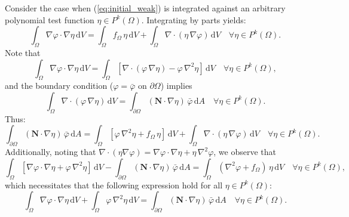 	Consider the case when (\ref{eq:initial_weak}) is integrated against an arbitrary polynomial test function $\eta \in P^k (\Omega)$. Integrating by parts yields:
	\begin{equation}
		\int_\Omega \nabla \varphi \cdot \nabla \eta \, \mathrm dV = \int_\Omega f_{\Omega} \, \eta \, \mathrm dV + \int_{\Omega} \nabla \cdot (\eta \, \nabla \varphi) \, \mathrm dV \quad \forall \eta \in P^k (\Omega).
	\end{equation}
	Note that
	\begin{equation}
		\int_\Omega \nabla \varphi \cdot \nabla \eta \, \mathrm dV = \int_\Omega \left[ \nabla \cdot (\varphi \, \nabla \eta) - \varphi \, \nabla^2 \eta \right] \, \mathrm dV \quad \forall \eta \in P^k (\Omega),
	\end{equation}
	and the boundary condition ($\varphi = \bar{\varphi}$ on $\partial \Omega$) implies
	\begin{equation}
		\int_\Omega \nabla \cdot (\varphi \, \nabla \eta) \, \mathrm dV = \int_{\partial \Omega} (\bm{N} \cdot \nabla \eta) \, \bar{\varphi} \, \mathrm dA \quad \forall \eta \in P^k (\Omega).
	\end{equation}
	Thus:
	\begin{equation}
		\int_{\partial \Omega} (\bm{N} \cdot \nabla \eta) \, \bar{\varphi} \, \mathrm dA = \int_\Omega \left[ \varphi \, \nabla^2 \eta + f_{\Omega} \, \eta \right] \, \mathrm dV + \int_{\Omega} \nabla \cdot (\eta \, \nabla \varphi) \, \mathrm dV \quad \forall \eta \in P^k (\Omega).
	\end{equation}
	Additionally, noting that $\nabla \cdot (\eta \nabla \varphi) = \nabla \varphi \cdot \nabla \eta + \eta \, \nabla^2 \varphi$, we observe that
	\begin{equation}
		\int_{\Omega} \left[ \nabla \varphi \cdot \nabla \eta + \varphi \, \nabla^2 \eta \right] \, \mathrm dV - \int_{\partial \Omega} (\bm{N} \cdot \nabla \eta) \, \bar{\varphi} \, \mathrm dA = \int_\Omega (\nabla^2 \varphi + f_{\Omega}) \, \eta \, \mathrm dV \quad \forall \eta \in P^k (\Omega),
	\end{equation}
	which necessitates that the following expression hold for all $\eta \in P^k (\Omega)$:
	\begin{equation}
		\int_{\Omega} \nabla \varphi \cdot \nabla \eta \, \mathrm dV + \int_{\Omega} \varphi \, \nabla^2 \eta \, \mathrm dV = \int_{\partial \Omega} (\bm{N} \cdot \nabla \eta) \, \bar{\varphi} \, \mathrm dA \quad \forall \eta \in P^k (\Omega).
	\end{equation}
	

